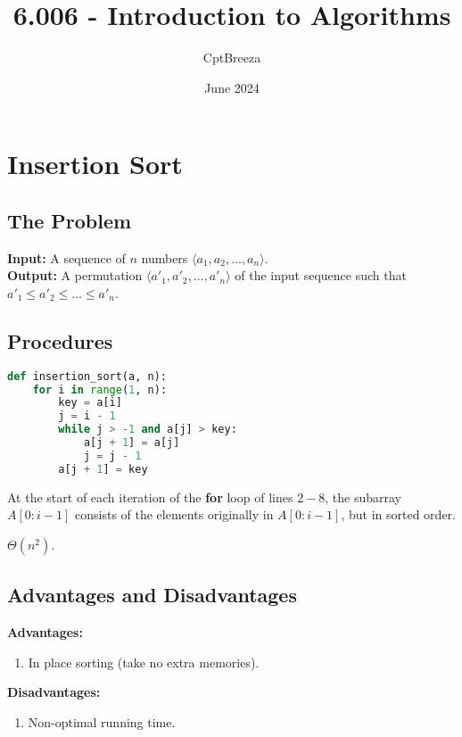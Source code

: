 \documentclass[11pt]{article}
\title{6.006 - Introduction to Algorithms}
\author{CptBreeza}
\date{June 2024}
\newcommand{\Prob}[2]{\textbf{Input:} {#1} \\ \textbf{Output:} {#2}}
\newcommand{\Arr}[1]{\langle {#1} \rangle}
\begin{document}
\maketitle

\section{Insertion Sort}

\subsection{The Problem}

\Prob
{A sequence of $n$ numbers $\Arr{a_1,a_2,\dots,a_n}$.}
{A permutation $\Arr{a'_1,a'_2,\dots,a'_n}$ of the input sequence such that
$a'_1 \leq a'_2 \leq \dots \leq a'_n$.}

\subsection{Procedures}

\begin{lstlisting}[language=Python]
def insertion_sort(a, n):
    for i in range(1, n):
        key = a[i]
        j = i - 1
        while j > -1 and a[j] > key:
            a[j + 1] = a[j]
            j = j - 1
        a[j + 1] = key
\end{lstlisting}

\begin{inv*}
At the start of each iteration of the \textbf{for} loop of lines $2-8$, the subarray
$A[0:i-1]$ consists of the elements originally in $A[0:i-1]$, but in sorted order.
\end{inv*}

\begin{rtime*}
$\Theta(n^2)$.
\end{rtime*}

\subsection{Advantages and Disadvantages}
\textbf{Advantages:}
\begin{enumerate}
\item In place sorting (take no extra memories).
\end{enumerate}
\textbf{Disadvantages:}
\begin{enumerate}
\item Non-optimal running time.
\end{enumerate}
\end{document}
